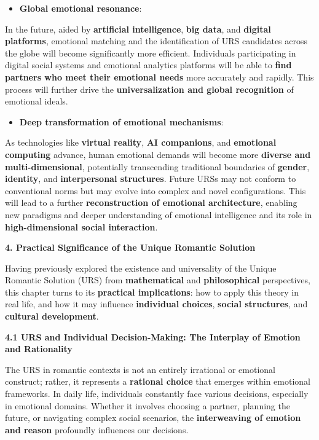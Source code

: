 \documentclass[
]{article}
\begin{document}
\begin{itemize}
\item
  \textbf{Global emotional resonance}:
\end{itemize}

In the future, aided by \textbf{artificial intelligence}, \textbf{big
data}, and \textbf{digital platforms}, emotional matching and the
identification of URS candidates across the globe will become
significantly more efficient. Individuals participating in digital
social systems and emotional analytics platforms will be able to
\textbf{find partners who meet their emotional needs} more accurately
and rapidly. This process will further drive the
\textbf{universalization and global recognition} of emotional ideals.

\begin{itemize}
\item
  \textbf{Deep transformation of emotional mechanisms}:
\end{itemize}

As technologies like \textbf{virtual reality}, \textbf{AI companions},
and \textbf{emotional computing} advance, human emotional demands will
become more \textbf{diverse and multi-dimensional}, potentially
transcending traditional boundaries of \textbf{gender},
\textbf{identity}, and \textbf{interpersonal structures}. Future URSs
may not conform to conventional norms but may evolve into complex and
novel configurations. This will lead to a further \textbf{reconstruction
of emotional architecture}, enabling new paradigms and deeper
understanding of emotional intelligence and its role in
\textbf{high-dimensional social interaction}.

\textbf{4. Practical Significance of the Unique Romantic Solution}

Having previously explored the existence and universality of the Unique
Romantic Solution (URS) from \textbf{mathematical} and
\textbf{philosophical} perspectives, this chapter turns to its
\textbf{practical implications}: how to apply this theory in real life,
and how it may influence \textbf{individual choices}, \textbf{social
structures}, and \textbf{cultural development}.

\textbf{4.1 URS and Individual Decision-Making: The Interplay of Emotion
and Rationality}

The URS in romantic contexts is not an entirely irrational or emotional
construct; rather, it represents a \textbf{rational choice} that emerges
within emotional frameworks. In daily life, individuals constantly face
various decisions, especially in emotional domains. Whether it involves
choosing a partner, planning the future, or navigating complex social
scenarios, the \textbf{interweaving of emotion and reason} profoundly
influences our decisions.
\end{document}
